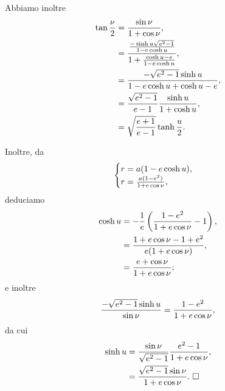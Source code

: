 \par Abbiamo inoltre
\begin{align*}
  \tan \frac{\nu}{2}
    &= \frac{\sin \nu}{1 + \cos \nu},\\
    &=  \frac{\frac{- \sinh{u}\sqrt{e^2 - 1}}
          {1 - e \cosh{u}}}
         {1 + \frac{\cosh{u} - e}
          {1 - e \cosh{u}}},\\
    &= \frac{- \sqrt{e^2 - 1} \sinh u}
        {1 - e \cosh u + \cosh u
          -  e},\\
    &= \frac{\sqrt{e^2 - 1}}{e - 1}
        \frac{\sinh u}{1 + \cosh u},\\
    &= \sqrt{\frac{e + 1}{e - 1}}
        \tanh \frac{u}{2}.
\end{align*}
\par Inoltre, da
\[
  \begin{cases}
	  r = a(1 - e \cosh{u}),\\
    r = \frac{a(1 - e^2)}
        {1 + e\cos{\nu}},
  \end{cases}
\]
deduciamo
\begin{align*}
  \cosh u
  &= - \frac{1}{e} \left (
    \frac{1 - e^2}{1 + e \cos \nu}
    - 1 \right ),\\
  &= \frac{1 + e \cos \nu - 1 + e^2}
      {e(1 + e \cos \nu)},\\
  &= \frac{e + \cos \nu}
      {1 + e \cos \nu};
\end{align*}
e inoltre
\[
	  \frac{- \sqrt{e^2 - 1} \sinh u}
      {\sin \nu}
    = \frac{1 - e^2}
      {1 + e\cos{\nu}},
\]
da cui
\begin{align*}
  \sinh u
  &= \frac{\sin \nu}
      {\sqrt{e^2 - 1}}
      \frac{e^2 - 1}
      {1 + e\cos{\nu}},\\
  &= \frac{\sqrt{e^2 - 1} \sin \nu}
      {1 + e\cos{\nu}}.\text{ $\square$}
\end{align*}
